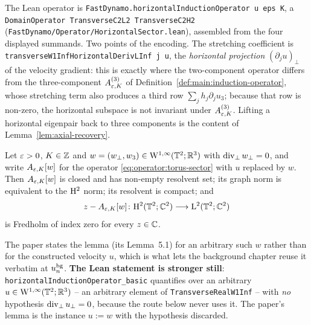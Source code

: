 The Lean operator is \texttt{FastDynamo.horizontalInductionOperator u eps K}, a
\texttt{DomainOperator TransverseC2L2 TransverseC2H2}
(\texttt{FastDynamo/Operator/HorizontalSector.lean}), assembled from the four displayed
summands.  Two points of the encoding.  The stretching coefficient is
\texttt{transverseW1InfHorizontalDerivLInf j u}, the \emph{horizontal projection}
$(\partial_ju)_\perp$ of the velocity gradient: this is exactly where the two-component
operator differs from the three-component $A_{\varepsilon,K}^{(3)}$ of
Definition~\ref{def:main:induction-operator}, whose stretching term also produces a third
row $\sum_jh_j\partial_ju_3$; because that row is non-zero, the horizontal subspace is not
invariant under $A^{(3)}_{\varepsilon,K}$.  Lifting a horizontal eigenpair back to three
components is the content of Lemma~\ref{lem:axial-recovery}.

\begin{lemma}
  \label{lem:torus-sector-basic}
  \leanok
  Let $\varepsilon>0$, $K\in\mathbb{Z}$ and $w=(w_\perp,w_3)\in\mathrm{W}^{1,\infty}(\mathbb{T}^2;\mathbb{R}^3)$ with
  $\operatorname{div}_\perp w_\perp=0$, and write $A_{\varepsilon,K}[w]$ for the operator
  \eqref{eq:operator:torus-sector} with $u$ replaced by $w$.  Then $A_{\varepsilon,K}[w]$ is closed
  and has non-empty resolvent set; its graph norm is equivalent to the $\mathrm{H}^2$ norm; its
  resolvent is compact; and
  \[
    z-A_{\varepsilon,K}[w]\colon\mathrm{H}^2(\mathbb{T}^2;\mathbb{C}^2)\longrightarrow\mathrm{L}^2(\mathbb{T}^2;\mathbb{C}^2)
  \]
  is Fredholm of index zero for every $z\in\mathbb{C}$.
\end{lemma}

The paper states the lemma (its Lemma~5.1) for an arbitrary such $w$ rather than for the
constructed velocity $u$, which is what lets the background chapter reuse it verbatim at
$u_n^{\rm bg}$.  \textbf{The Lean statement is stronger still}:
\texttt{horizontalInductionOperator\_basic} quantifies over an arbitrary
$u\in\mathrm{W}^{1,\infty}(\mathbb{T}^2;\mathbb{R}^3)$ -- an arbitrary element of \texttt{TransverseRealW1Inf} --
with \emph{no} hypothesis $\operatorname{div}_\perp u_\perp=0$, because the route below never uses it.
The paper's lemma is the instance $u:=w$ with the hypothesis discarded.

